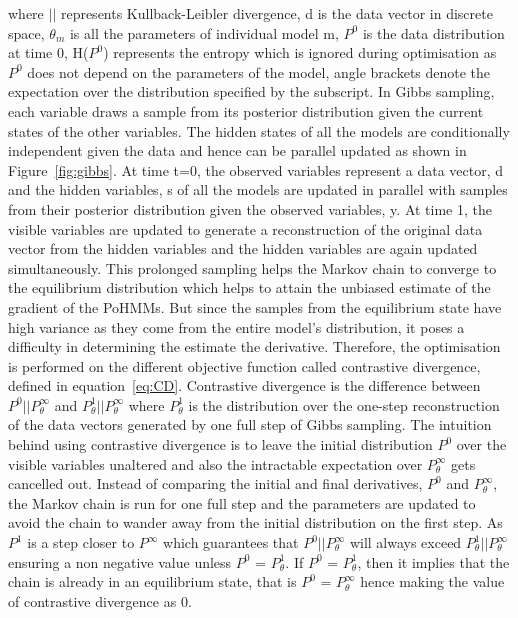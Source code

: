 \documentclass[runningheads,a4paper]{llncs}
\begin{document}
where $||$ represents Kullback-Leibler divergence, d is the data vector in discrete space, $\theta_m$ is all the parameters of individual model m, $P^0$ is the data distribution at time $0$, H($P^0$) represents the entropy which is ignored during optimisation as $P^0$ does not depend on the parameters of the model, angle brackets denote the expectation over the distribution specified by the subscript.
In Gibbs sampling, each variable draws a sample from its posterior distribution given the current states of the other variables. The hidden states of all the models are conditionally independent given the data and hence can be parallel updated as shown in Figure~\ref{fig:gibbs}. At time t=0, the observed variables represent a data vector, d and the hidden variables, s of all the models are updated in parallel with samples from their posterior distribution given the observed variables, y. At time 1, the visible variables are updated to generate a reconstruction of the original data vector from the hidden variables and the hidden variables are again updated simultaneously. This prolonged sampling helps the Markov chain to converge to the equilibrium distribution which helps to attain the unbiased estimate of the gradient of the PoHMMs. But since the samples from the equilibrium state have high variance as they come from the entire model's distribution, it poses a difficulty in determining the estimate the derivative. Therefore, the optimisation is performed on the different objective function called contrastive divergence, defined in equation~\ref{eq:CD}. Contrastive divergence is the difference between $P^0 || P^\infty_\theta$ and $P^1_\theta || P^\infty_\theta$ where $P^1_\theta$ is the distribution over the one-step reconstruction of the data vectors generated by one full step of Gibbs sampling. The intuition behind using contrastive divergence is to leave the initial distribution $P^{0}$ over the visible variables unaltered and also the intractable expectation over $P^\infty_\theta$ gets cancelled out. Instead of comparing the initial and final derivatives, $P^0$ and $P^\infty_\theta$, the Markov chain is run for one full step and the parameters are updated to avoid the chain to wander away from the initial distribution on the first step. As $P^1$ is a step closer to $P^\infty$ which guarantees that $P^0 || P^\infty_\theta$ will always exceed $P^1_\theta || P^\infty_\theta$ ensuring a non negative value unless $P^0$ = $P^1_\theta$. If $P^0$ = $P^1_\theta$, then it implies that the chain is already in an equilibrium state, that is $P^0$ = $P^\infty_\theta$ hence making the value of contrastive divergence as $0$.
\end{document}
